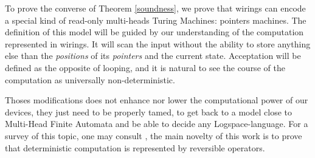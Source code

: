 To prove the converse of Theorem \ref{soundness}, we prove that wirings can encode a special kind of read-only multi-heads Turing Machines: pointers machines.
The definition of this model will be guided by our understanding of the computation represented in wirings.
It will scan the input without the ability to store anything else than the \emph{positions} of its \emph{pointers} and the current state.
Acceptation will be defined as the opposite of looping, and it is natural to see the course of the computation as universally non-deterministic.

Thoses modifications does not enhance nor lower the computational power of our devices, they just need to be properly tamed, to get back to a model close to Multi-Head Finite Automata and be able to decide any {\sc Logspace}-language.
For a survey of this topic, one may consult \cite[Chap.4]{Aubert2013b}, the main novelty of this work is to prove that deterministic computation is represented by reversible operators.



